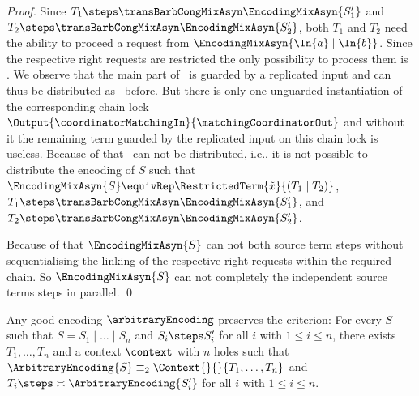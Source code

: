 \documentclass[]{llncs}
\begin{document}
\begin{proof}
	Since $ T_1 \steps \transBarbCongMixAsyn \EncodingMixAsyn{S_1'} $ and $ T_2 \steps \transBarbCongMixAsyn \EncodingMixAsyn{S_2'} $, both $ T_1 $ and $ T_2 $ need the ability to proceed a request from $ \EncodingMixAsyn{\In{a} \mid \In{b}} $. Since the respective right requests are restricted the only possibility to process them is \processRightInputRequests. We observe that the main part of \processRightInputRequests \ is guarded by a replicated input and can thus be distributed as \processLeftOutputRequests \ before. But there is only one unguarded instantiation of the corresponding chain lock $ \Output{\coordinatorMatchingIn}{\matchingCoordinatorOut} $ and without it the remaining term guarded by the replicated input on this chain lock is useless. Because of that \processRightInputRequests \ can not be distributed, i.e., it is not possible to distribute the encoding of $ S $ such that $ \EncodingMixAsyn{S} \equivRep \RestrictedTerm{\tilde{x}}{\left( T_1 \mid T_2 \right)} $, $ T_1 \steps \transBarbCongMixAsyn \EncodingMixAsyn{S_1'} $, and $ T_2 \steps \transBarbCongMixAsyn \EncodingMixAsyn{S_2'} $.
	
	Because of that $ \EncodingMixAsyn{S} $ can not \simulate both source term steps without sequentialising the linking of the respective right requests within the required chain. So $ \EncodingMixAsyn{S} $ can not completely \simulate the independent source terms steps in parallel.
	\qed
\end{proof}

\begin{lemma}
	Any good encoding $ \arbitraryEncoding $ preserves the criterion: For every $ S $ such that $ S = S_1 \mid \ldots \mid S_n $ and $ S_i \steps S_i' $ for all $ i $ with $ 1 \leq i \leq n $, there exists $ T_1, \ldots, T_n $ and a context $ \context $ with $ n $ holes such that $ \ArbitraryEncoding{S} \equiv_2 \Context{}{}{T_1, \ldots, T_n} $ and $ T_i \steps \asymp \ArbitraryEncoding{S_i'} $ for all $ i $ with $ 1 \leq i \leq n $.
\end{lemma}
\end{document}
